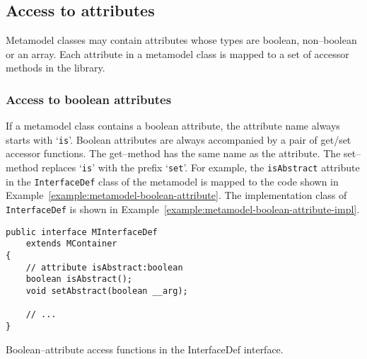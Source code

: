 \subsection{Access to attributes}

Metamodel classes may contain attributes whose types are boolean, non--boolean
or an array. Each attribute in a metamodel class is mapped to a set of accessor
methods in the library.

\subsubsection{Access to boolean attributes}

If a metamodel class contains a boolean attribute, the attribute name always
starts with `{\tt is}'. Boolean attributes are always accompanied by a pair of
get/set accessor functions. The get--method has the same name as the attribute.
The set--method replaces `{\tt is}' with the prefix `{\tt set}'. For example,
the {\tt isAbstract} attribute in the {\tt InterfaceDef} class of the metamodel
is mapped to the code shown in
Example~\ref{example:metamodel-boolean-attribute}. The implementation class of
{\tt InterfaceDef} is shown in
Example~\ref{example:metamodel-boolean-attribute-impl}.

\begin{Example}
\begin{minifbox}
\begin{small}
\begin{verbatim}
public interface MInterfaceDef
    extends MContainer
{
    // attribute isAbstract:boolean
    boolean isAbstract();
    void setAbstract(boolean __arg);

    // ...
}
\end{verbatim}
\end{small}
\end{minifbox}
\caption{Boolean--attribute access functions in the InterfaceDef interface.}
\label{example:metamodel-boolean-attribute}
\end{Example}

